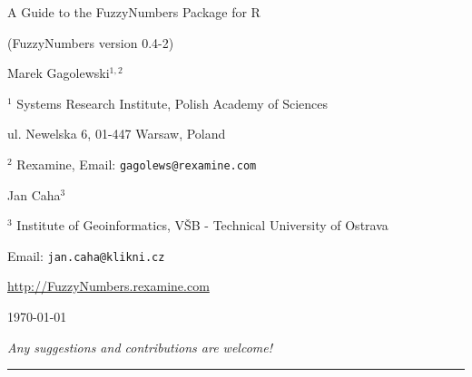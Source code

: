 \documentclass[11pt]{article}\usepackage[]{graphicx}\usepackage[]{color}
\newcommand{\package}[1]{\textsf{#1}\xspace}
\newcommand{\lang}[1]{\textsf{#1}\xspace}
\newcommand{\R}{\lang{R}}
\begin{document}



\begin{center}
{\LARGE\sf A Guide to the \package{FuzzyNumbers} Package for \R}

{\Large\sf (FuzzyNumbers version {0.4-2}) }

\bigskip
{\large Marek Gagolewski${}^{1,2}$}

${}^{1}$ Systems Research Institute, Polish Academy of Sciences

ul. Newelska 6, 01-447 Warsaw, Poland

${}^{2}$ Rexamine, Email: \texttt{gagolews@rexamine.com}

{\large Jan Caha${}^{3}$}

${}^{3}$ Institute of Geoinformatics, VŠB - Technical University of Ostrava

Email: \texttt{jan.caha@klikni.cz}

\bigskip

\href{http://FuzzyNumbers.rexamine.com/}%
{http://FuzzyNumbers.rexamine.com}

\bigskip
\today



\medskip
\textit{Any suggestions and contributions are welcome!}
\end{center}





\bigskip\hrule\bigskip
\tableofcontents




\end{document}
